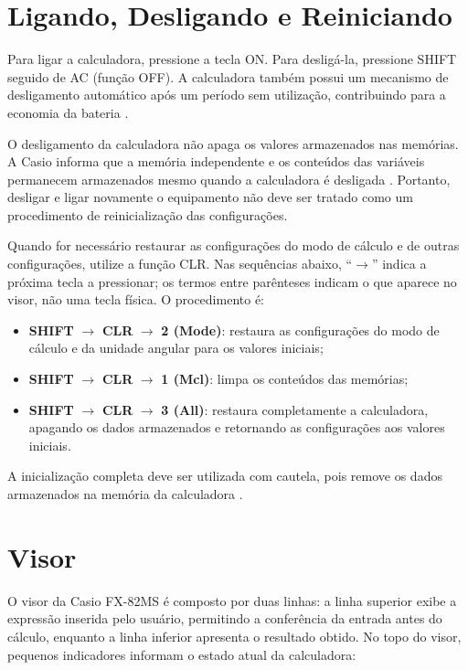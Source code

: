 \section{Ligando, Desligando e Reiniciando}

Para ligar a calculadora, pressione a tecla ON. Para desligá-la, pressione SHIFT seguido de AC (função OFF). A calculadora também possui um mecanismo de desligamento automático após um período sem utilização, contribuindo para a economia da bateria \cite{casio2004}.

O desligamento da calculadora não apaga os valores armazenados nas memórias. A Casio informa que a memória independente e os conteúdos das variáveis permanecem armazenados mesmo quando a calculadora é desligada \cite{casio2004}. Portanto, desligar e ligar novamente o equipamento não deve ser tratado como um procedimento de reinicialização das configurações.

Quando for necessário restaurar as configurações do modo de cálculo e de outras configurações, utilize a função CLR. Nas sequências abaixo, ``$\rightarrow$'' indica a próxima tecla a pressionar; os termos entre parênteses indicam o que aparece no visor, não uma tecla física. O procedimento é:

\begin{itemize}
\item \textbf{SHIFT} $\rightarrow$ \textbf{CLR} $\rightarrow$ \textbf{2 (Mode)}: restaura as configurações do modo de cálculo e da unidade angular para os valores iniciais;
\item \textbf{SHIFT} $\rightarrow$ \textbf{CLR} $\rightarrow$ \textbf{1 (Mcl)}: limpa os conteúdos das memórias;
\item \textbf{SHIFT} $\rightarrow$ \textbf{CLR} $\rightarrow$ \textbf{3 (All)}: restaura completamente a calculadora, apagando os dados armazenados e retornando as configurações aos valores iniciais.
\end{itemize}

A inicialização completa deve ser utilizada com cautela, pois remove os dados armazenados na memória da calculadora \cite{casio2004}.

\section{Visor}

O visor da Casio FX-82MS é composto por duas linhas: a linha superior exibe a 
expressão inserida pelo usuário, permitindo a conferência da entrada antes 
do cálculo, enquanto a linha inferior apresenta o resultado obtido. No topo 
do visor, pequenos indicadores informam o estado atual da calculadora:

